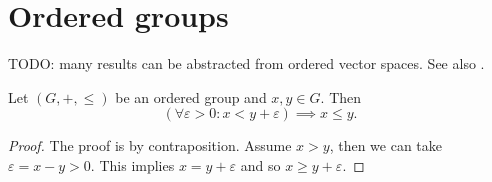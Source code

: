 \section{Ordered groups}

TODO: many results can be abstracted from ordered vector spaces. See also \cite{blyth_orderedAlgebraicStructures}.

\begin{lemma}
Let $(G,+,\leq)$ be an ordered group and $x,y\in G$. Then
\[ (\forall \varepsilon > 0: x< y+\varepsilon) \implies x\leq y. \]
\end{lemma}
\begin{proof}
The proof is by contraposition. Assume $x>y$, then we can take $\varepsilon = x-y>0$. This implies $x = y+\varepsilon$ and so $x \geq y+\varepsilon$. 
\end{proof}